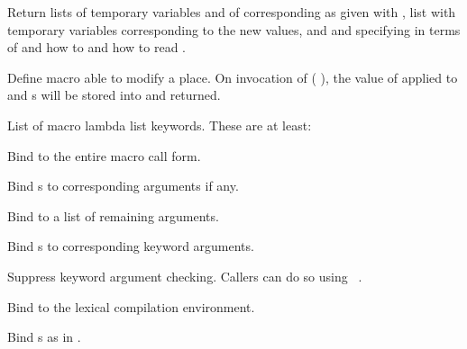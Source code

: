 \begin{LIST}{1cm}
  {
    Return lists of temporary variables  and of
    corresponding  as given with ,
    list  with temporary variables
    corresponding to the new values, and 
    and  specifying in terms of 
    and  how to  and how to read
    .
  }

  {
    Define macro  able to modify a place. On
    invocation of (  ), the value of
     applied to  and s will be
    stored into  and returned.
  }

  {List of macro lambda list keywords. These are at least:
  }
  \begin{LIST}{.5cm}

    {Bind  to the entire macro call form.}

    {Bind s to corresponding arguments if any.}

    {Bind  to a list of remaining arguments.}

    {Bind s to corresponding keyword arguments.}

    {
      Suppress keyword argument checking. Callers can do so using
      ~\T.
    }

    {Bind  to the lexical compilation environment.}

    {Bind s as in .}

  \end{LIST}
\end{LIST}



